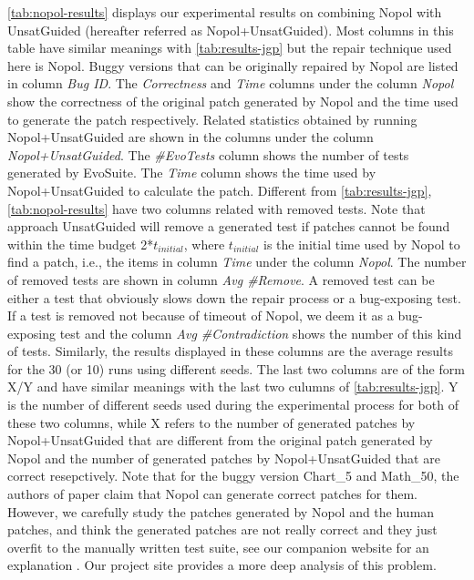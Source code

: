 \documentclass[]{sig-alternate}
\begin{document}
\autoref{tab:nopol-results} displays our experimental results on combining Nopol with UnsatGuided (hereafter referred as Nopol+\-Unsat\-Guided). Most columns in this table have similar meanings with \autoref{tab:results-jgp} but the repair technique used here is Nopol. Buggy versions that can be originally repaired by Nopol are listed in column \emph{Bug ID}. The \emph{Correctness} and \emph{Time} columns under the column \emph{Nopol} show the correctness of the original patch generated by Nopol and the time used to generate the patch respectively. Related statistics obtained by running Nopol+UnsatGuided are shown in the columns under the column \emph{Nopol+UnsatGuided}. The \emph{\#EvoTests} column shows the number of tests generated by EvoSuite. The \emph{Time} column shows the time used by Nopol+UnsatGuided to calculate the patch. Different from \autoref{tab:results-jgp}, \autoref{tab:nopol-results} have two columns related with removed tests. Note that approach UnsatGuided will remove a generated test if patches cannot be found within the time budget 2*$t_{initial}$, where $t_{initial}$ is the initial time used by Nopol to find a patch, i.e., the items in column \emph{Time} under the column \emph{Nopol}. The number of removed tests are shown in column \emph{Avg \#Remove}. A removed test can be either a test that obviously slows down the repair process or a bug-exposing test. If a test is removed not because of timeout of Nopol, we deem it as a bug-exposing test and the column \emph{Avg \#Contradiction} shows the number of this kind of tests. Similarly, the results displayed in these columns are the average results for the 30 (or 10) runs using different seeds. The last two columns are of the form X/Y and have similar meanings with the last two culumns of \autoref{tab:results-jgp}. Y is the number of different seeds used during the experimental process for both of these two columns, while X refers to the number of generated patches by Nopol+UnsatGuided that are different from the original patch generated by Nopol and the number of generated patches by Nopol+UnsatGuided that are correct resepctively. Note that for the buggy version Chart\_5 and Math\_50, the authors of paper \cite{defects4j-repair} claim that Nopol can generate correct patches for them. However, we carefully study the patches generated by Nopol and the human patches, and think the generated patches are not really correct and they just overfit to the manually written test suite, see our companion website for an explanation \cite{replication-site}. Our project site provides a more deep analysis of this problem. 
\end{document}
